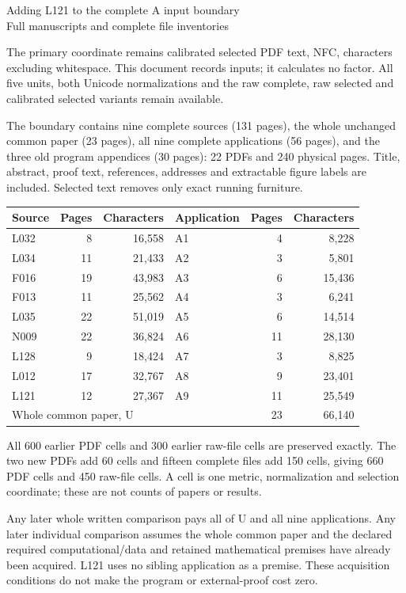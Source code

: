 \documentclass[10pt]{article}
\begin{document}
\begin{center}{\Large Adding L121 to the complete A input boundary}\\[4pt]
Full manuscripts and complete file inventories\end{center}
The primary coordinate remains calibrated selected PDF text, NFC, characters
excluding whitespace. This document records inputs; it calculates no factor.
All five units, both Unicode normalizations and the raw complete, raw selected
and calibrated selected variants remain available.

The boundary contains nine complete sources (131 pages), the whole unchanged
common paper (23 pages), all nine complete applications (56 pages), and the
three old program appendices (30 pages): 22 PDFs and 240 physical pages.
Title, abstract, proof text, references, addresses and extractable figure labels
are included. Selected text removes only exact running furniture.

\begin{center}\begin{tabular}{lrrlrr}\toprule
Source & Pages & Characters & Application & Pages & Characters\\\midrule
L032 & 8 & 16,558 & A1 & 4 & 8,228\\
L034 & 11 & 21,433 & A2 & 3 & 5,801\\
F016 & 19 & 43,983 & A3 & 6 & 15,436\\
F013 & 11 & 25,562 & A4 & 3 & 6,241\\
L035 & 22 & 51,019 & A5 & 6 & 14,514\\
N009 & 22 & 36,824 & A6 & 11 & 28,130\\
L128 & 9 & 18,424 & A7 & 3 & 8,825\\
L012 & 17 & 32,767 & A8 & 9 & 23,401\\
L121 & 12 & 27,367 & A9 & 11 & 25,549\\
\midrule
\multicolumn{3}{l}{Whole common paper, U} & & 23 & 66,140\\
\bottomrule\end{tabular}\end{center}
All 600 earlier PDF cells and 300 earlier raw-file cells are preserved exactly.
The two new PDFs add 60 cells and fifteen complete files add 150 cells, giving
660 PDF cells and 450 raw-file cells. A cell is one metric, normalization and
selection coordinate; these are not counts of papers or results.

Any later whole written comparison pays all of U and all nine applications.
Any later individual comparison assumes the whole common paper and the declared
required computational/data and retained mathematical premises have already
been acquired. L121 uses no sibling application as a premise. These acquisition
conditions do not make the program or external-proof cost zero.
\end{document}
